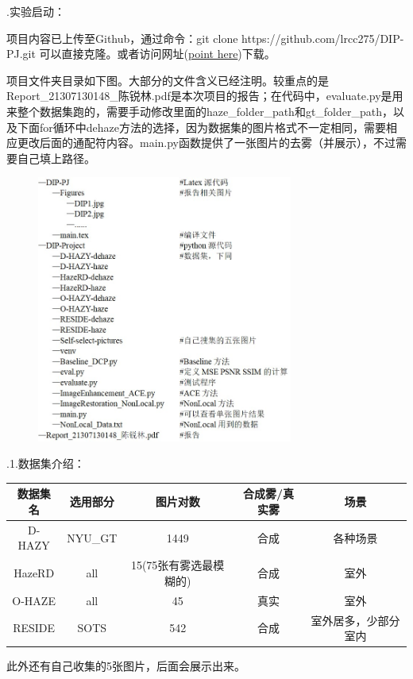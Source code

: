 \documentclass[12pt]{article}
\begin{document}
\begin{large}
    .实验启动：\par
\end{large}
项目内容已上传至Github，通过命令：\;git clone https://github.com/lrcc275/DIP-PJ.git 可以直接克隆。或者访问网址(\href{https://github.com/lrcc275/DIP-PJ.git}{point here})下载。\par
项目文件夹目录如下图。大部分的文件含义已经注明。较重点的是Report\_21307130148\_陈锐林.pdf是本次项目的报告；在代码中，evaluate.py是用来整个数据集跑的，需要手动修改里面的haze\_folder\_path和gt\_folder\_path，以及下面for循环中dehaze方法的选择，因为数据集的图片格式不一定相同，需要相应更改后面的通配符内容。main.py函数提供了一张图片的去雾（并展示），不过需要自己填上路径。
\begin{figure}[h]
    \centering
    \includegraphics[width = 0.75\textwidth]{dip5.jpg}
\end{figure}
\newpage
{}.1.数据集介绍：\par
\begin{table}[h]
\centering
\begin{tabular}{ccccc} %
\toprule 
数据集名 & 选用部分 & 图片对数  & 合成雾/真实雾 & 场景 \\ 
\midrule
D-HAZY & NYU\_GT  & 1449 & 合成 & 各种场景\\
HazeRD & all & 15(75张有雾选最模糊的) & 合成 & 室外\\
O-HAZE & all & 45 & 真实 & 室外 \\
RESIDE & SOTS & 542 & 合成 & 室外居多，少部分室内\\
\bottomrule 
\end{tabular}
\end{table}
此外还有自己收集的5张图片，后面会展示出来。\\
\end{document}
